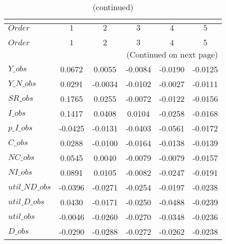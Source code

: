  
\begin{center}
\begin{longtable}{lccccc} 
\caption{COEFFICIENTS OF AUTOCORRELATION}\\
 \label{Table:th_autocorr_matrix}\\
\toprule 
$Order          $	 & 	 $          1$	 & 	 $          2$	 & 	 $          3$	 & 	 $          4$	 & 	 $          5$\\
\midrule \endfirsthead 
\caption{(continued)}\\
 \toprule \\ 
$Order          $	 & 	 $          1$	 & 	 $          2$	 & 	 $          3$	 & 	 $          4$	 & 	 $          5$\\
\midrule \endhead 
\midrule \multicolumn{6}{r}{(Continued on next page)} \\ \bottomrule \endfoot 
\bottomrule \endlastfoot 
$Y\_obs         $	 & 	     0.0672	 & 	     0.0055	 & 	    -0.0084	 & 	    -0.0190	 & 	    -0.0125 \\ 
$Y\_N\_obs      $	 & 	     0.0291	 & 	    -0.0034	 & 	    -0.0102	 & 	    -0.0027	 & 	    -0.0111 \\ 
$SR\_obs        $	 & 	     0.1765	 & 	     0.0255	 & 	    -0.0072	 & 	    -0.0122	 & 	    -0.0156 \\ 
$I\_obs         $	 & 	     0.1417	 & 	     0.0408	 & 	     0.0104	 & 	    -0.0258	 & 	    -0.0168 \\ 
$p\_I\_obs      $	 & 	    -0.0425	 & 	    -0.0131	 & 	    -0.0403	 & 	    -0.0561	 & 	    -0.0172 \\ 
$C\_obs         $	 & 	     0.0288	 & 	    -0.0100	 & 	    -0.0164	 & 	    -0.0138	 & 	    -0.0139 \\ 
$NC\_obs        $	 & 	     0.0545	 & 	     0.0040	 & 	    -0.0079	 & 	    -0.0079	 & 	    -0.0157 \\ 
$NI\_obs        $	 & 	     0.0891	 & 	     0.0105	 & 	    -0.0082	 & 	    -0.0247	 & 	    -0.0191 \\ 
$util\_ND\_obs  $	 & 	    -0.0396	 & 	    -0.0271	 & 	    -0.0254	 & 	    -0.0197	 & 	    -0.0238 \\ 
$util\_D\_obs   $	 & 	     0.0430	 & 	    -0.0171	 & 	    -0.0250	 & 	    -0.0488	 & 	    -0.0239 \\ 
$util\_obs      $	 & 	    -0.0046	 & 	    -0.0260	 & 	    -0.0270	 & 	    -0.0348	 & 	    -0.0236 \\ 
$D\_obs         $	 & 	    -0.0290	 & 	    -0.0288	 & 	    -0.0272	 & 	    -0.0262	 & 	    -0.0238 \\ 
\end{longtable}
 \end{center}
